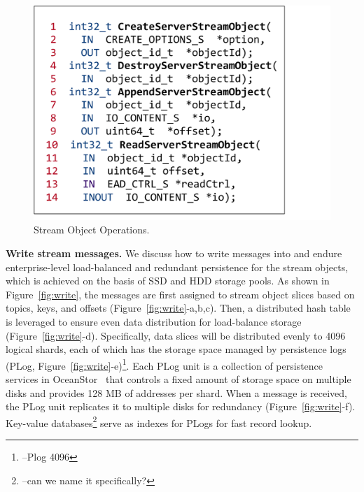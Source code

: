 \begin{figure}[!t]
	\centering
	\hspace{2.5em}
	\includegraphics[scale=0.35]{figures/streamobject}
	\vspace{-1em}
	\caption{Stream Object Operations.}
	\label{fig:streamobject}
	\vspace{-1em}
\end{figure}



\noindent \textbf{Write stream messages.} We discuss how to write messages into \sys and endure enterprise-level load-balanced and redundant persistence for the stream objects, which is achieved on the basis of SSD and HDD storage pools.  As shown in Figure~\ref{fig:write}, the messages are first   assigned to stream object slices based on topics, keys, and offsets (Figure~\ref{fig:write}-a,b,c). Then, a distributed hash table is leveraged to ensure even data distribution for load-balance storage (Figure~\ref{fig:write}-d). Specifically, data slices will be distributed evenly to 4096 logical shards, each of which has the storage space managed by persistence logs (PLog, Figure~\ref{fig:write}-e)\footnote{--Plog 4096}. Each PLog unit is a collection of persistence services in OceanStor~\cite{} that controls a fixed amount of storage space on multiple disks and provides 128 MB of addresses per shard. When a message is received, the PLog unit replicates it to multiple disks for redundancy (Figure~\ref{fig:write}-f). Key-value databases\footnote{--can we name it specifically?} serve as indexes for PLogs for fast record lookup.



